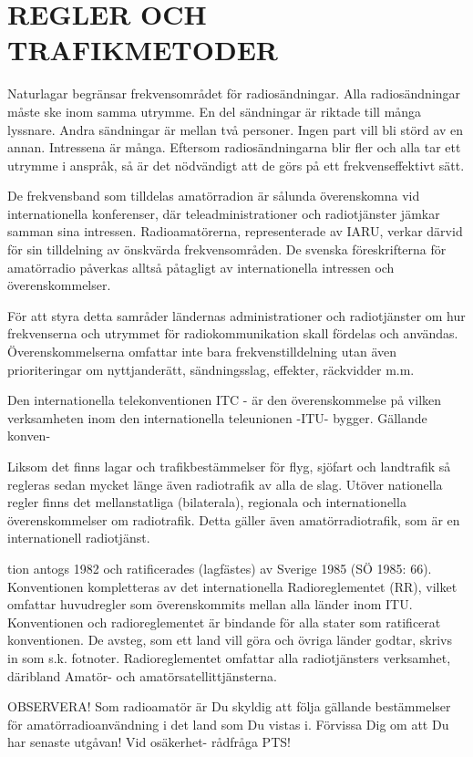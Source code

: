 \part{REGLER OCH TRAFIKMETODER}

Naturlagar begränsar frekvensområdet för
radiosändningar. Alla radiosändningar måste
ske inom samma utrymme. En del sändningar är riktade till många lyssnare. Andra
sändningar är mellan två personer. Ingen
part vill bli störd av en annan. Intressena är
många. Eftersom radiosändningarna blir fler
och alla tar ett utrymme i anspråk, så är det
nödvändigt att de görs på ett frekvenseffektivt
sätt.

De frekvensband som tilldelas amatörradion är sålunda överenskomna vid internationella konferenser, där teleadministrationer och radiotjänster jämkar samman sina
intressen. Radioamatörerna, representerade av IARU, verkar därvid för sin tilldelning
av önskvärda frekvensområden. De svenska föreskrifterna för amatörradio påverkas
alltså påtagligt av internationella intressen
och överenskommelser.

För att styra detta samråder ländernas
administrationer och radiotjänster om hur
frekvenserna och utrymmet för radiokommunikation skall fördelas och användas.
Överenskommelserna omfattar inte bara
frekvenstilldelning utan även prioriteringar
om nyttjanderätt, sändningsslag, effekter,
räckvidder m.m.

Den internationella telekonventionen ITC - är den överenskommelse på vilken
verksamheten inom den internationella teleunionen -ITU- bygger. Gällande konven-

Liksom det finns lagar och trafikbestämmelser för flyg, sjöfart och landtrafik så regleras sedan mycket länge även radiotrafik av
alla de slag. Utöver nationella regler finns
det mellanstatliga (bilaterala), regionala och
internationella överenskommelser om radiotrafik. Detta gäller även amatörradiotrafik,
som är en internationell radiotjänst.

tion antogs 1982 och ratificerades (lagfästes) av Sverige 1985 (SÖ 1985: 66). Konventionen kompletteras av det internationella Radioreglementet (RR), vilket omfattar
huvudregler som överenskommits mellan
alla länder inom ITU.
Konventionen och radioreglementet är
bindande för alla stater som ratificerat
konventionen. De avsteg, som ett land vill
göra och övriga länder godtar, skrivs in som
s.k. fotnoter. Radioreglementet omfattar alla
radiotjänsters verksamhet, däribland Amatör- och amatörsatellittjänsterna.

OBSERVERA!
Som radioamatör är Du skyldig att följa gällande bestämmelser
för amatörradioanvändning i det land som Du vistas i.
Förvissa Dig om att Du har senaste utgåvan!
Vid osäkerhet- rådfråga PTS!
